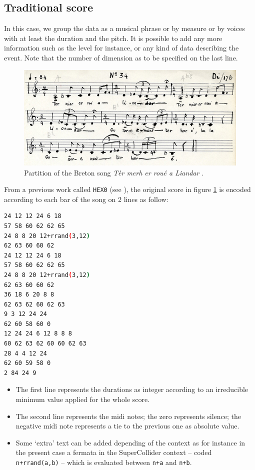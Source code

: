 \subsection{Traditional score}
\label{tradscore}

In this case, we group the data as a musical phrase or by measure or by voices with at least the duration and the pitch. It is possible to add any more information such as the level for instance, or any kind of data describing the event. Note that the number of dimension as to be specified on the last line.

\begin{figure}[!hbt]
	\begin{center}
		\includegraphics[scale=0.23]{img/2334}
		\caption{Partition of the Breton song \textit{T\`er merh er rou\'e a Liandar} \citep{mbb}.}
		\label{fig:ch34}
	\end{center}
\end{figure}

From a previous work called \texttt{HEX0} (see ), the original score in figure \ref{fig:ch34} is encoded according to each bar of the song on 2 lines as follow:

\begin{lstlisting}[language=bash]
24 12 12 24 6 18
57 58 60 62 62 65
24 8 8 20 12+rrand(3,12)
62 63 60 60 62
24 12 12 24 6 18
57 58 60 62 62 65
24 8 8 20 12+rrand(3,12)
62 63 60 60 62
36 18 6 20 8 8
62 63 62 60 62 63
9 3 12 24 24
62 60 58 60 0
12 24 24 6 12 8 8 8
60 62 63 62 60 60 62 63
28 4 4 12 24
62 60 59 58 0
2 84 24 9
\end{lstlisting}

\begin{itemize}
\item The first line represents the durations as integer according to an irreducible minimum value applied for the whole score.
\item The second line represents the midi notes; the zero represents silence; the negative midi note represents a tie to the previous one as absolute value.
\item Some `extra' text can be added depending of the context as for instance in the present case a fermata in the SuperCollider context --  coded \texttt{n+rrand(a,b)} -- which is evaluated between \texttt{n+a} and \texttt{n+b}.
\end{itemize}


